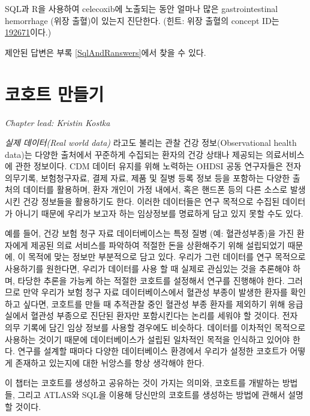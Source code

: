 \documentclass[11pt]{book}
\theoremstyle{definition}
\theoremstyle{definition}
\theoremstyle{definition}
\theoremstyle{remark}
\begin{document}
\protect\hypertarget{exr:exerciseGiBleedsDuringCelecoxib}{}{\label{exr:exerciseGiBleedsDuringCelecoxib}
}SQL과 R을 사용하여 celecoxib에 노출되는 동안 얼마나 많은
gastrointestinal hemorrhage (위장 출혈)이 있는지 진단한다. (힌트: 위장
출혈의 concept ID는
\href{http://athena.ohdsi.org/search-terms/terms/192671}{192671}이다.)

제안된 답변은 부록 \ref{SqlAndRanswers}에서 찾을 수 있다.

\chapter{코호트 만들기}\label{Cohorts}

\emph{Chapter lead: Kristin Kostka}

\emph{실제 데이터(Real world data)} 라고도 불리는 관찰 건강
정보(Observational health data)는 다양한 출처에서 꾸준하게 수집되는
환자의 건강 상태나 제공되는 의료서비스에 관한 정보이다. CDM 데이터
유지를 위해 노력하는 OHDSI 공동 연구자들은 전자의무기록, 보험청구자료,
결제 자료, 제품 및 질병 등록 정보 등을 포함하는 다양한 출처의 데이터를
활용하며, 환자 개인이 가정 내에서, 혹은 핸드폰 등의 다른 소스로 발생시킨
건강 정보들을 활용하기도 한다. 이러한 데이터들은 연구 목적으로 수집된
데이터가 아니기 때문에 우리가 보고자 하는 임상정보를 명료하게 담고 있지
못할 수도 있다.

예를 들어, 건강 보험 청구 자료 데이터베이스는 특정 질병 (예:
혈관성부종)을 가진 환자에게 제공된 의료 서비스를 파악하여 적절한 돈을
상환해주기 위해 설립되었기 때문에, 이 목적에 맞는 정보만 부분적으로 담고
있다. 우리가 그런 데이터를 연구 목적으로 사용하기를 원한다면, 우리가
데이터를 사용 할 때 실제로 관심있는 것을 추론해야 하며, 타당한 추론을
가능케 하는 적절한 코호트를 설정해서 연구를 진행해야 한다. 그러므로 만약
우리가 보험 청구 자료 데이터베이스에서 혈관성 부종이 발생한 환자를
확인하고 싶다면, 코호트를 만들 때 추적관찰 중인 혈관성 부종 환자를
제외하기 위해 응급실에서 혈관성 부종으로 진단된 환자만 포함시킨다는
논리를 세워야 할 것이다. 전자 의무 기록에 담긴 임상 정보를 사용할
경우에도 비슷하다. 데이터를 이차적인 목적으로 사용하는 것이기 때문에
데이터베이스가 설립된 일차적인 목적을 인식하고 있어야 한다. 연구를
설계할 때마다 다양한 데이터베이스 환경에서 우리가 설정한 코호트가 어떻게
존재하고 있는지에 대한 뉘앙스를 항상 생각해야 한다.

이 챕터는 코호트를 생성하고 공유하는 것이 가지는 의미와, 코호트를
개발하는 방법들, 그리고 ATLAS와 SQL을 이용해 당신만의 코호트를 생성하는
방법에 관해서 설명할 것이다.
\end{document}
